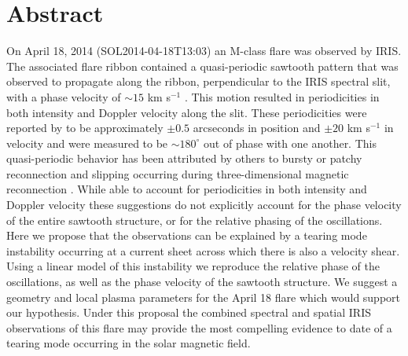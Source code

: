 

\newcommand{\curl}{\nabla \times}
\newcommand{\grad}{\nabla}
\newcommand{\pardiv}[3]{\frac{\partial^{#3} {#1}}{\partial {#2}^{#3}}}
\newcommand{\adiv}[1]{\frac{D {#1}}{Dt}}
\newcommand{\adivlong}[1]{\frac{\partial{#1}}{\partial t} + (\mathbf{u} \cdot \nabla){#1}}
\newcommand{\BLQ}{BLQ}


\newcommand{\gmodel}{.00928}
\newcommand{\Lundquistmodel}{10^4}
\newcommand{\kmodel}{.1315}
\newcommand{\posmodel}{[86,18]}








\section{Abstract}
	On April 18, 2014 (SOL2014-04-18T13:03) an M-class flare was observed by IRIS.  The associated flare ribbon contained a quasi-periodic sawtooth pattern that was observed to propagate along the ribbon, perpendicular to the IRIS spectral slit, with a phase velocity of $\sim 15$ km s$^{-1}$ \citep{Brannon2015}.  This motion resulted in periodicities in both intensity and Doppler velocity along the slit.  These periodicities were reported by \citet{Brannon2015} to be approximately $\pm0.5$ arcseconds in position and $\pm20$ km s$^{-1}$ in velocity and were measured to be $\sim180^{\circ}$ out of phase with one another. This quasi-periodic behavior has been attributed by others to bursty or patchy reconnection \citep{Brosius2015,Brosius2016} and slipping occurring during three-dimensional magnetic reconnection \citep{Li2015,Li2016}.  While able to account for periodicities in both intensity and Doppler velocity these suggestions do not explicitly account for the phase velocity of the entire sawtooth structure, or for the relative phasing of the oscillations. Here we propose that the observations can be explained by a tearing mode instability occurring at a current sheet across which there is also a velocity shear. Using a linear model of this instability we reproduce the relative phase of the oscillations, as well as the phase velocity of the sawtooth structure.   We suggest a geometry and local plasma parameters for the April 18 flare which would support our hypothesis.  Under this proposal the combined spectral and spatial IRIS observations of this flare may provide the most compelling evidence to date of a tearing mode occurring in the solar magnetic field.



